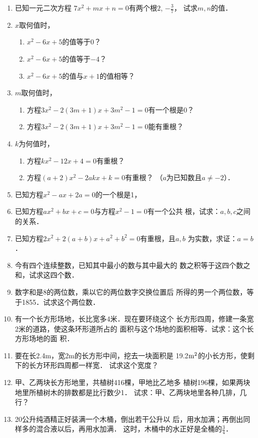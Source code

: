 \begin{enumerate}
\item 已知一元二次方程
$7x^2+mx+n=0$有两个根$2$, $-\frac{3}{7}$，
试求$m,n$的值．

\item $x$取何值时，
\begin{enumerate}
    \item $x^2-6x+5$的值等于0？
    \item $x^2-6x+5$的值等于$-4$？
    \item $x^2-6x+5$的值与$x+1$的值相等？
\end{enumerate}

\item $m$取何值时，
\begin{enumerate}
    \item 方程$3x^2-2(3m+1)x+3m^2-1=0$有一个根是0？
    \item 方程$3x^2-2(3m+1)x+3m^2-1=0$能有重根？
\end{enumerate}

\item $k$为何值时，
\begin{enumerate}
    \item 方程$kx^2-12x+4=0$有重根？
    \item 方程$(a+2)x^2-2akx+k=0$有重根？
（$a$为已知数且$a\ne-2$）．
\end{enumerate}

\item 已知方程$x^2-ax+2a=0$的一个根是1，
\begin{enumerate}
  
\end{enumerate}

\item 已知方程$ax^2+bx+c=0$与方程$x^2-1=0$有一个公共
根，试求：$a,b,c$之间的关系．
\item 已知方程$2x^2+2(a+b)x+a^2+b^2=0$有重根，且$a,b$
为实数，求证：$a=b$．
\item 今有四个连续整数，已知其中最小的数与其中最大的
数之积等于这四个数之和，试求这四个数．
\item 数字和是8的两位数，乘以它的两位数字交换位置后
所得的男一个两位数，等于1855．试求这个两位数．
\item 有一个长方形场地，长比宽多4米．现在要环绕这个
长方形四周，修建一条宽2米的道路，使这条环形道所占的
面积与这个场地的面积相等．试求：这个长方形场地的面
积．
\item 要在长2.4m，宽2m的长方形中间，挖去一块面积是
19.2${\rm m^2}$的小长方形，使剩下的长方环形四周都一样宽．
试求这个宽度？
\item 甲、乙两块长方形地里，共植树416棵，甲地比乙地多
植树196棵，如果两块地里所植树木的排数都是比行数少1．
试求：甲、乙两块地里各种几排，几行？
\item 20公升纯酒精正好装满一个木桶，倒出若干公升以
后，用水加满；再倒出同样多的混合液以后，再用水加满．
这时，木桶中的水正好是全桶的$\frac{3}{4}$．


\end{enumerate}
